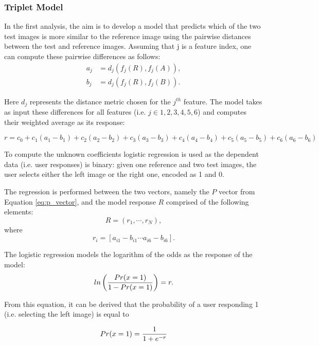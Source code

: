 \subsubsection{Triplet Model}
In the first analysis, the aim is to develop a model that predicts which of the two test images is more similar to the reference image using the pairwise distances between the test and reference images. Assuming that j is a feature index, one can compute these pairwise differences as follows:
\begin{align}
    a_j &= d_j(f_j(R), f_j(A)), \\
   b_j &= d_j(f_j(R), f_j(B)). 
\end{align}

Here $d_j$ represents the distance metric chosen for the $j^{th}$ feature. The model takes as input these differences for all features (i.e. $j \in {1, 2, 3, 4, 5, 6}$) and computes their weighted average as its response:

\begin{equation}
    r = c_0 + c_1(a_1 - b_1) + c_2(a_2 - b_2) + c_3(a_3 - b_3)+ c_4(a_4 - b_4) + c_5(a_5 - b_5) + c_6(a_6 - b_6)
\end{equation}
 

To compute the unknown coefficients logistic regression is used as the dependent data (i.e. user responses)
is binary: given one reference and two test images, the user selects either the left image or the right one,
encoded as 1 and 0.

The regression is performed between the two vectors, namely the $P$ vector from Equation \ref{eq:p_vector}, and the model response $R$ comprised of the following elements:
\begin{equation}
    R = (r_1,\cdots, r_N ),
\end{equation}
where
\begin{equation}
    r_i = [a_{i1} - b_{i1} \cdots a_{i6} - b_{i6}].
\end{equation}

The logistic regression models the logarithm of the odds as the response of the model:
\begin{equation}
   ln \left( {{Pr(x = 1)} \over { 1 - Pr(x = 1)}} \right) = r. 
\end{equation}


From this equation, it can be derived that the probability of a user responding 1 (i.e. selecting the left image) is equal to

\begin{equation}
\label{eq:response_prob}
    Pr(x = 1) = {{1} \over {1 + e^{-r}}}
\end{equation}

